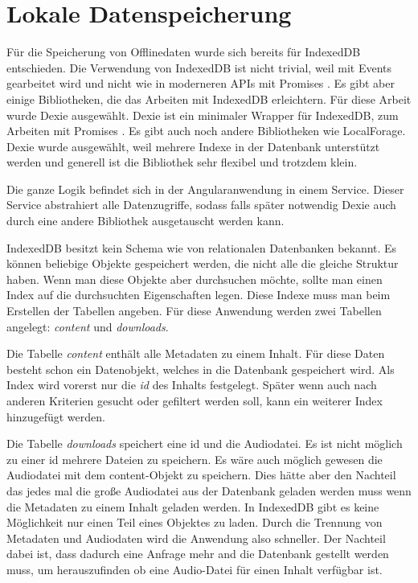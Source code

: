\section{Lokale Datenspeicherung}
\label{Kap5:Speicherung}
Für die Speicherung von Offlinedaten wurde sich bereits für IndexedDB entschieden. Die Verwendung von IndexedDB ist nicht trivial, weil mit Events gearbeitet wird und nicht wie in moderneren APIs mit Promises \autocite{mdn-indexeddb}. Es gibt aber einige Bibliotheken, die das Arbeiten mit IndexedDB erleichtern. Für diese Arbeit wurde Dexie ausgewählt. Dexie ist ein minimaler Wrapper für IndexedDB, zum Arbeiten mit Promises \autocite{dexie}. Es gibt auch noch andere Bibliotheken wie LocalForage. Dexie wurde ausgewählt, weil mehrere Indexe in der Datenbank unterstützt werden und generell ist die Bibliothek sehr flexibel und trotzdem klein.

Die ganze Logik befindet sich in der Angularanwendung in einem Service. Dieser Service abstrahiert alle Datenzugriffe, sodass falls später notwendig Dexie auch durch eine andere Bibliothek ausgetauscht werden kann. 

IndexedDB besitzt kein Schema wie von relationalen Datenbanken bekannt. Es können beliebige Objekte gespeichert werden, die nicht alle die gleiche Struktur haben. Wenn man diese Objekte aber durchsuchen möchte, sollte man einen Index auf die durchsuchten Eigenschaften legen. Diese Indexe muss man beim Erstellen der Tabellen angeben. Für diese Anwendung werden zwei Tabellen angelegt: \emph{content} und \emph{downloads}. 

Die Tabelle \emph{content} enthält alle Metadaten zu einem Inhalt. Für diese Daten besteht schon ein Datenobjekt, welches in die Datenbank gespeichert wird. Als Index wird vorerst nur die \emph{id} des Inhalts festgelegt. Später wenn auch nach anderen Kriterien gesucht oder gefiltert werden soll, kann ein weiterer Index hinzugefügt werden. 

Die Tabelle \emph{downloads} speichert eine id und die Audiodatei. Es ist nicht möglich zu einer id mehrere Dateien zu speichern. Es wäre auch möglich gewesen die Audiodatei mit dem content-Objekt zu speichern. Dies hätte aber den Nachteil das jedes mal die große Audiodatei aus der Datenbank geladen werden muss wenn die Metadaten zu einem Inhalt geladen werden. In IndexedDB gibt es keine Möglichkeit nur einen Teil eines Objektes zu laden. Durch die Trennung von Metadaten und Audiodaten wird die Anwendung also schneller. Der Nachteil dabei ist, dass dadurch eine Anfrage mehr and die Datenbank gestellt werden muss, um herauszufinden ob eine Audio-Datei für einen Inhalt verfügbar ist.

